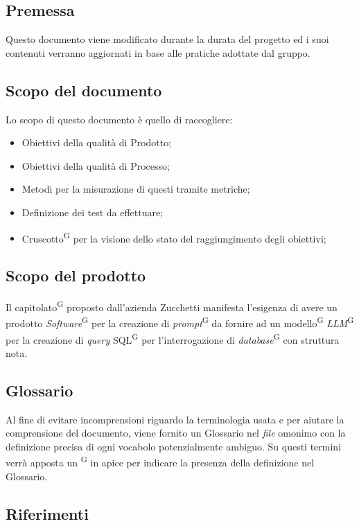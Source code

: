 \documentclass[5pt]{article}
\begin{document}
	\subsection{Premessa}
	Questo documento viene modificato durante la durata del progetto ed i suoi contenuti verranno aggiornati in base alle pratiche adottate dal gruppo.
	
	\subsection{Scopo del documento}
	Lo scopo di questo documento è quello di raccogliere:
	\begin{itemize}
		\item Obiettivi della qualità di Prodotto;
		\item Obiettivi della qualità di Processo;
		\item Metodi per la misurazione di questi tramite metriche;
		\item Definizione dei test da effettuare;
		\item Cruscotto\textsuperscript{G} per la visione dello stato del raggiungimento degli obiettivi;
	\end{itemize}
	
	\subsection{Scopo del prodotto}
	Il capitolato\textsuperscript{G} proposto dall'azienda Zucchetti manifesta l'esigenza di avere un prodotto \textit{Software}\textsuperscript{G} per la creazione di \textit{prompt}\textsuperscript{G} da fornire ad un modello\textsuperscript{G} \textit{LLM}\textsuperscript{G} per la creazione di \textit{query} SQL\textsuperscript{G} per l'interrogazione di \textit{database}\textsuperscript{G} con struttura nota.
	
	\subsection{Glossario}
	Al fine di evitare incomprensioni riguardo la terminologia usata e per aiutare la comprensione del documento,
	viene fornito un Glossario nel \textit{file} omonimo con la definizione precisa di ogni vocabolo potenzialmente ambiguo. Su questi termini verrà apposta un \textsuperscript{G} in apice per indicare la presenza della definizione nel Glossario.
	
	\subsection{Riferimenti}
\end{document}
